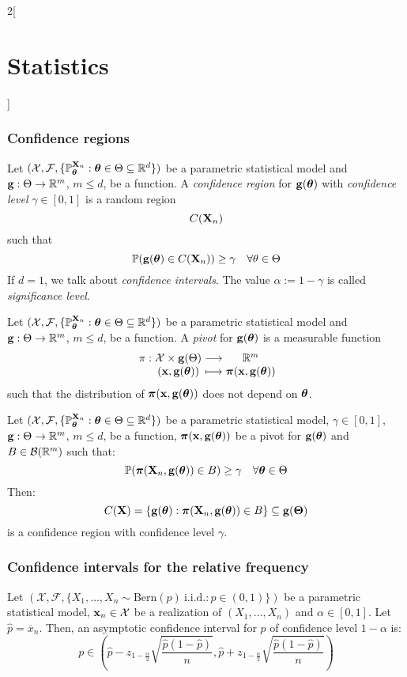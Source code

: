 \documentclass[../../../main.tex]{subfiles}
\begin{document}
\begin{multicols}{2}[\section{Statistics}]
  \subsubsection{Confidence regions}
  \begin{definition}
    Let $(\mathcal{X},\mathcal{F},\{\mathbb{P}_{\boldsymbol{\mathrm{\theta}}}^{\boldsymbol{\mathrm{X}}_n}:\boldsymbol{\mathrm{\theta}}\in\Theta\subseteq\mathbb{R}^d\})$ be a parametric statistical model and $\boldsymbol{\mathrm{g}}:\Theta\rightarrow\mathbb{R}^m$, $m\leq d$, be a function. A \emph{confidence region} for $\boldsymbol{\mathrm{g}}(\boldsymbol{\mathrm{\theta}})$ with \emph{confidence level} $\gamma\in[0,1]$ is a random region $$C(\boldsymbol{\mathrm{X}}_n)$$ such that $$\mathbb{P}(\boldsymbol{\mathrm{g}}(\boldsymbol{\mathrm{\theta}})\in C(\boldsymbol{\mathrm{X}}_n))\geq \gamma\quad\forall \theta\in\Theta$$ If $d=1$, we talk about \emph{confidence intervals}. The value $\alpha:=1-\gamma$ is called \emph{significance level}.
  \end{definition}
  \begin{definition}
    Let $(\mathcal{X},\mathcal{F},\{\mathbb{P}_{\boldsymbol{\mathrm{\theta}}}^{\boldsymbol{\mathrm{X}}_n}:\boldsymbol{\mathrm{\theta}}\in\Theta\subseteq\mathbb{R}^d\})$ be a parametric statistical model and $\boldsymbol{\mathrm{g}}:\Theta\rightarrow\mathbb{R}^m$, $m\leq d$, be a function. A \emph{pivot} for $\boldsymbol{\mathrm{g}}(\boldsymbol{\mathrm{\theta}})$ is a measurable function
    $$\function{\pi}{\mathcal{X}\times \vf{g}(\Theta)}{\RR^m}{(\vf{x},\vf{g}(\vf\theta))}{\vf\pi(\vf{x},\vf{g}(\vf\theta))}$$
    such that the distribution of $\boldsymbol{\mathrm{\pi}}(\boldsymbol{\mathrm{x}},\boldsymbol{\mathrm{g}}(\boldsymbol{\mathrm{\theta}}))$ does not depend on $\boldsymbol{\mathrm{\theta}}$.
  \end{definition}
  \begin{proposition}
    Let $(\mathcal{X},\mathcal{F},\{\mathbb{P}_{\boldsymbol{\mathrm{\theta}}}^{\boldsymbol{\mathrm{X}}_n}:\boldsymbol{\mathrm{\theta}}\in\Theta\subseteq\mathbb{R}^d\})$ be a parametric statistical model, $\gamma\in[0,1]$, $\boldsymbol{\mathrm{g}}:\Theta\rightarrow\mathbb{R}^m$, $m\leq d$, be a function, $\boldsymbol{\mathrm{\pi}}(\boldsymbol{\mathrm{x}},\boldsymbol{\mathrm{g}}(\boldsymbol{\mathrm{\theta}}))$ be a pivot for $\boldsymbol{\mathrm{g}}(\boldsymbol{\mathrm{\theta}})$ and $B\in\mathcal{B}(\mathbb{R}^m)$ such that: $$\mathbb{P}(\boldsymbol{\mathrm{\pi}}(\boldsymbol{\mathrm{X}}_n,\boldsymbol{\mathrm{g}}(\boldsymbol{\mathrm{\theta}}))\in B)\geq \gamma\quad\forall \boldsymbol{\mathrm{\theta}}\in\Theta$$
    Then: $$C(\boldsymbol{\mathrm{X}})=\{\boldsymbol{\mathrm{g}}(\boldsymbol{\mathrm{\theta}}):\boldsymbol{\mathrm{\pi}}(\boldsymbol{\mathrm{X}}_n,\boldsymbol{\mathrm{g}}(\boldsymbol{\mathrm{\theta}}))\in B\}\subseteq \boldsymbol{\mathrm{g}}(\boldsymbol{\mathrm{\Theta}})$$
    is a confidence region with confidence level $\gamma$.
  \end{proposition}
  \subsubsection{Confidence intervals for the relative frequency}
  \begin{proposition}
    Let $(\mathcal{X},\mathcal{F},\{X_1,\ldots,X_n\sim\text{Bern}(p)\ \text{i.i.d.}:p\in(0,1)\})$ be a parametric statistical model, $\boldsymbol{\mathrm{x}}_n\in\mathcal{X}$ be a realization of $(X_1,\ldots,X_n)$ and $\alpha\in[0,1]$. Let $\hat{p}=\overline{x}_n$. Then, an asymptotic confidence interval for $p$ of confidence level $1-\alpha$ is:
    $$p\in\left(\hat{p}-z_{1-\frac{\alpha}{2}}\sqrt{\frac{\hat{p}(1-\hat{p})}{n}},\hat{p}+z_{1-\frac{\alpha}{2}}\sqrt{\frac{\hat{p}(1-\hat{p})}{n}}\right)$$
  \end{proposition}

\end{multicols}
\end{document}

